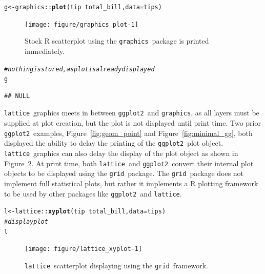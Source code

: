 \documentclass[stat,dissertation]{puthesis}\usepackage[]{graphicx}\usepackage{xcolor}
\makeatletter
\newcommand{\hlcom}[1]{\textcolor[rgb]{0.678,0.584,0.686}{\textit{#1}}}%
\newcommand{\hlopt}[1]{\textcolor[rgb]{0,0,0}{#1}}%
\newcommand{\hlstd}[1]{\textcolor[rgb]{0.345,0.345,0.345}{#1}}%
\newcommand{\hlkwb}[1]{\textcolor[rgb]{0.69,0.353,0.396}{#1}}%
\newcommand{\hlkwc}[1]{\textcolor[rgb]{0.333,0.667,0.333}{#1}}%
\newcommand{\hlkwd}[1]{\textcolor[rgb]{0.737,0.353,0.396}{\textbf{#1}}}%
\newenvironment{kframe}{%
 \def\at@end@of@kframe{}%
 \ifinner\ifhmode%
  \def\at@end@of@kframe{\end{minipage}}%
  \begin{minipage}{\columnwidth}%
 \fi\fi%
 \def\FrameCommand##1{\hskip\@totalleftmargin \hskip-\fboxsep
 \colorbox{shadecolor}{##1}\hskip-\fboxsep
     \hskip-\linewidth \hskip-\@totalleftmargin \hskip\columnwidth}%
 \MakeFramed {\advance\hsize-\width
   \@totalleftmargin\z@ \linewidth\hsize
   \@setminipage}}%
 {\par\unskip\endMakeFramed%
 \at@end@of@kframe}
\newenvironment{knitrout}{}{} %
\renewenvironment{knitrout}{\setstretch{1}}{}
\newcommand{\pkg}[1]{\texttt{#1}}
\newcommand{\ggplot}{\pkg{ggplot2}}
\makeatother
\begin{document}
\begin{knitrout}\small
{}\color{fgcolor}\begin{kframe}
\begin{alltt}
\hlstd{g} \hlkwb{<-} \hlstd{graphics}\hlopt{::}\hlkwd{plot}\hlstd{(tip} \hlopt{~} \hlstd{total_bill,} \hlkwc{data} \hlstd{= tips)}
\end{alltt}
\end{kframe}\begin{figure}[H]

{\centering \texttt{[image: figure/graphics\_plot-1]} 

}

\caption{Stock R scatterplot using the \pkg{graphics}~package is printed immediately.}\label{fig:graphics_plot}
\end{figure}

\begin{kframe}\begin{alltt}
\hlcom{# nothing is stored, as plot is already displayed}
\hlstd{g}
\end{alltt}
\begin{verbatim}
## NULL
\end{verbatim}
\end{kframe}
\end{knitrout}

\pkg{lattice}~graphics meets in between \ggplot~and \pkg{graphics}, as all layers must be supplied at plot creation, but the plot is not displayed until print time.  Two prior \ggplot~examples, Figure~\ref{fig:geom_point} and Figure~\ref{fig:minimal_gg}, both displayed the ability to delay the printing of the \ggplot~plot object.  \pkg{lattice}~graphics can also delay the display of the plot object as shown in Figure~\ref{fig:lattice_xyplot}.  At print time, both \pkg{lattice}~and \ggplot~convert their internal plot objects to be displayed using the \pkg{grid}~package.  The \pkg{grid}~package does not implement full statistical plots, but rather it implements a R plotting framework to be used by other packages like \ggplot~and \pkg{lattice}.

\begin{knitrout}\small
{}\color{fgcolor}\begin{kframe}
\begin{alltt}
\hlstd{l} \hlkwb{<-} \hlstd{lattice}\hlopt{::}\hlkwd{xyplot}\hlstd{(tip} \hlopt{~} \hlstd{total_bill,} \hlkwc{data} \hlstd{= tips)}
\hlcom{# display plot}
\hlstd{l}
\end{alltt}
\end{kframe}\begin{figure}[H]

{\centering \texttt{[image: figure/lattice\_xyplot-1]} 

}

\caption{\pkg{lattice}~scatterplot displaying using the \pkg{grid}~framework.}\label{fig:lattice_xyplot}
\end{figure}


\end{knitrout}
\end{document}
